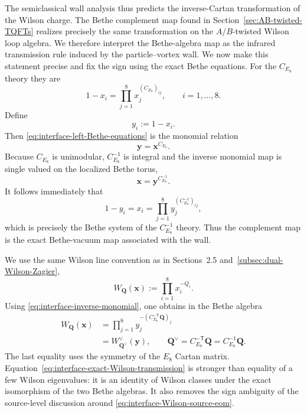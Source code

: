 \documentclass[11pt,a4paper]{article}
\numberwithin{equation}{section}
\begin{document}
The semiclassical wall analysis thus predicts the inverse-Cartan transformation of the Wilson charge.  The Bethe complement map found in Section~\ref{sec:AB-twisted-TQFTs} realizes precisely the same transformation on the $A/B$-twisted Wilson loop algebra.  We therefore interpret the Bethe-algebra map as the infrared transmission rule induced by the particle--vortex wall.  We now make this statement precise and fix the sign using the exact Bethe equations.  For the $C_{E_8}$ theory they are
\begin{equation}
  1-x_i
  =\prod_{j=1}^{8}x_j^{(C_{E_8})_{ij}},
  \qquad i=1,\ldots,8.
  \label{eq:interface-left-Bethe-equations}
\end{equation}
Define
\begin{equation}
  y_i:=1-x_i.
  \label{eq:interface-complement-coordinate}
\end{equation}
Then \eqref{eq:interface-left-Bethe-equations} is the monomial relation
\begin{equation}
  \boldsymbol y=\boldsymbol x^{C_{E_8}}.
  \label{eq:interface-complement-monomial}
\end{equation}
Because $C_{E_8}$ is unimodular, $C_{E_8}^{-1}$ is integral and the inverse monomial map is single valued on the localized Bethe torus,
\begin{equation}
  \boldsymbol x=\boldsymbol y^{C_{E_8}^{-1}}.
  \label{eq:interface-inverse-monomial}
\end{equation}
It follows immediately that
\begin{equation}
  1-y_i=x_i
  =\prod_{j=1}^{8}y_j^{(C_{E_8}^{-1})_{ij}},
  \label{eq:interface-right-Bethe-equations}
\end{equation}
which is precisely the Bethe system of the $C_{E_8}^{-1}$ theory.  Thus the complement map is the exact Bethe-vacuum map associated with the wall.

We use the same Wilson line convention as in Sections~2.5 and~\ref{subsec:dual-Wilson-Zagier},
\begin{equation}
  W_{\boldsymbol Q}(\boldsymbol x)
  :=\prod_{i=1}^{8}x_i^{-Q_i}.
  \label{eq:interface-Wilson-convention}
\end{equation}
Using \eqref{eq:interface-inverse-monomial}, one obtains in the Bethe algebra
\begin{align}
  W_{\boldsymbol Q}(\boldsymbol x)
  &=\prod_{j=1}^{8}
  y_j^{-(C_{E_8}^{-\mathsf T}\boldsymbol Q)_j}
  \nonumber\\
  &=W_{\boldsymbol Q^\vee}^{\vee}(\boldsymbol y),
  \qquad
  \boldsymbol Q^\vee=C_{E_8}^{-\mathsf T}\boldsymbol Q
  =C_{E_8}^{-1}\boldsymbol Q.
  \label{eq:interface-exact-Wilson-transmission}
\end{align}
The last equality uses the symmetry of the $E_8$ Cartan matrix.  Equation~\eqref{eq:interface-exact-Wilson-transmission} is stronger than equality of a few Wilson eigenvalues: it is an identity of Wilson classes under the exact isomorphism of the two Bethe algebras.  It also removes the sign ambiguity of the source-level discussion around \eqref{eq:interface-Wilson-source-eom}.
\end{document}
